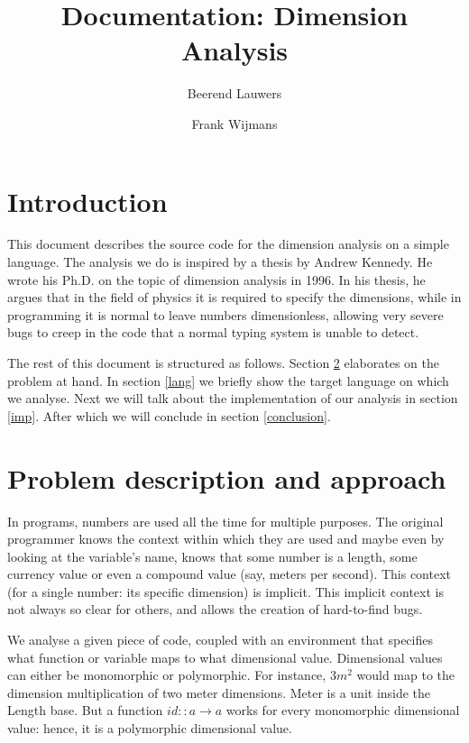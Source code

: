 \documentclass[a4paper,10pt]{article}
\title{Documentation: Dimension Analysis}
\author{Beerend Lauwers \and Frank Wijmans}
\begin{document}
\maketitle

\section{Introduction}

This document describes the source code for the dimension analysis on a simple language.
The analysis we do is inspired by a thesis\cite{langanddim} by Andrew Kennedy.
He wrote his Ph.D. on the topic of dimension analysis in 1996.
In his thesis, he argues that  in the field of physics it is required to specify the dimensions, while in programming it is normal to leave numbers dimensionless, allowing very severe bugs to creep in the code that a normal typing system is unable to detect.

The rest of this document is structured as follows.
Section \ref{problem} elaborates on the problem at hand.
In section \ref{lang} we briefly show the target language on which we analyse.
Next we will talk about the implementation of our analysis in section \ref{imp}.
After which we will conclude in section \ref{conclusion}.

\section{Problem description and approach}\label{problem}

In programs, numbers are used all the time for multiple purposes. 
The original programmer knows the context within which they are used and maybe even by looking at the variable's name, knows that some number is a length, some currency value or even a compound value (say, meters per second).
This context (for a single number: its specific dimension) is implicit.
This implicit context is not always so clear for others, and allows the creation of hard-to-find bugs.

We analyse a given piece of code, coupled with an environment that specifies what function or variable maps to what dimensional value.
Dimensional values can either be monomorphic or polymorphic.
For instance, $3 m^2$ would map to the dimension multiplication of two meter dimensions. 
Meter is a unit inside the Length base.
But a function $id :: a \rightarrow a$ works for every monomorphic dimensional value: hence, it is a polymorphic dimensional value.
\end{document}
